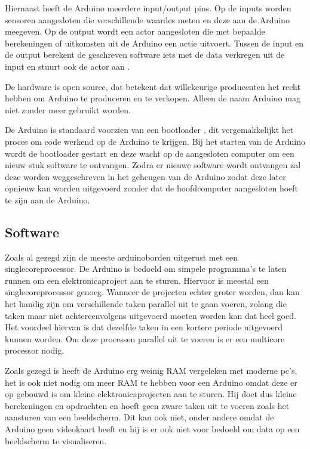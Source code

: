 \documentclass[a4paper, dutch, abstract=true]{scrartcl}
\begin{document}
Hiernaast heeft de Arduino meerdere input/output pins.
Op de inputs worden sensoren aangesloten die verschillende waardes meten en deze aan de Arduino
meegeven.
Op de output wordt een actor aangesloten die met bepaalde berekeningen of uitkomsten uit de Arduino
een actie uitvoert.
Tussen de input en de output berekent de geschreven software iets met de data verkregen uit de input
en stuurt ook de actor aan \cite{arduinoreference}.

De hardware is open source, dat betekent dat willekeurige producenten het recht hebben om Arduino te
produceren en te verkopen.
Alleen de naam Arduino mag niet zonder meer gebruikt worden.

De Arduino is standaard voorzien van een bootloader \cite{optiboot2019github}, dit vergemakkelijkt
het proces om code werkend op de Arduino te krijgen.
Bij het starten van de Arduino wordt de bootloader gestart en deze wacht op de aangesloten computer
om een nieuw stuk software te ontvangen.
Zodra er nieuwe software wordt ontvangen zal deze worden weggeschreven in het geheugen van de
Arduino zodat deze later opnieuw kan worden uitgevoerd zonder dat de hoofdcomputer aangesloten hoeft
te zijn aan de Arduino.

\subsection{Software}
Zoals al gezegd zijn de meeste arduinoborden uitgerust met een singlecoreprocessor.
De Arduino is bedoeld om simpele programma's te laten runnen om een elektronicaproject aan te
sturen.
Hiervoor is meestal een singlecoreprocessor genoeg.
Wanneer de projecten echter groter worden, dan kan het handig zijn om verschillende taken parallel
uit te gaan voeren, zolang die taken maar niet achtereenvolgens uitgevoerd moeten worden kan dat
heel goed.
Het voordeel hiervan is dat dezelfde taken in een kortere periode uitgevoerd kunnen worden.
Om deze processen parallel uit te voeren is er een multicore processor nodig.

Zoals gezegd is heeft de Arduino erg weinig RAM vergeleken met moderne pc's, het is ook niet nodig
om meer RAM te hebben voor een Arduino omdat deze er op gebouwd is om kleine elektronicaprojecten
aan te sturen.
Hij doet dus kleine berekeningen en opdrachten en hoeft geen zware taken uit te voeren zoals het
aansturen van een beeldscherm.
Dit kan ook niet, onder andere omdat de Arduino geen videokaart heeft en hij is er ook niet voor
bedoeld om data op een beeldscherm te visualiseren.
\end{document}
